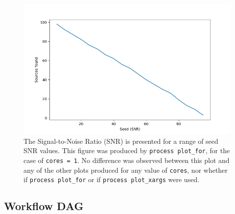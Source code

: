 \documentclass{article}
\begin{document}
\begin{figure}[h]
  \centering
  \includegraphics[scale = 0.75]{../nextflow/output/plot_for_1.png}
  \caption[SNR Plot]{
    The Signal-to-Noise Ratio (SNR) is presented for a range of seed SNR values.
    This figure was produced by
    \lstinline[morekeywords={process}]{process plot_for}, for the case of
    \lstinline{cores = 1}.
    No difference was observed between this plot and any of the other plots
    produced for any value of \lstinline{cores}, nor whether if
    \lstinline[morekeywords={process}]{process plot_for} or if
    \lstinline[morekeywords={process}]{process plot_xargs} were used.
  }
  \label{fig:snr-plot}
\end{figure}

\subsection{Workflow DAG}
\label{sec:workflow-dag}
\end{document}
